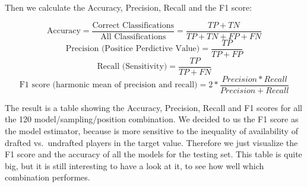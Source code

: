 \documentclass[]{article}
\begin{document}
Then we calculate the Accuracy, Precision, Recall and the F1 score:

\[\text{Accuracy} = \frac{\text{Correct Classifications}}{\text{All Classifications}} = \frac{TP + TN}{TP+TN+FP+FN}\]
\[\text{Precision (Positice Perdictive Value)} = \frac{TP}{TP+FP}\]
\[\text{Recall (Sensitivity)} = \frac{TP}{TP+FN}\]
\[\text{F1 score (harmonic mean of precision and recall)}= 2*\frac{Precision * Recall}{Precision + Recall}\]

The result is a table showing the Accuracy, Precision, Recall and F1
scores for all the 120 model/sampling/position combination. We decided
to us the F1 score as the model estimator, because is more sensitive to
the inequality of availability of drafted vs.~undrafted players in the
target value. Therefore we just visualize the F1 score and the accuracy
of all the models for the testing set. This table is quite big, but it
is still interesting to have a look at it, to see how well which
combination performes.

\newpage
\end{document}
